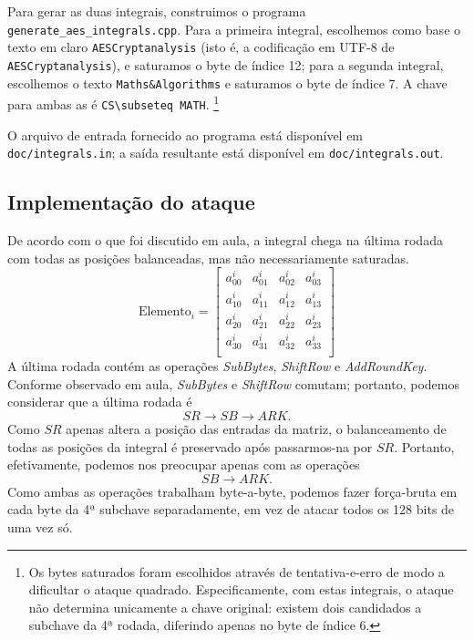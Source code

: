 \documentclass{article}
\begin{document}
Para gerar as duas integrais, construimos o programa \verb"generate_aes_integrals.cpp".
Para a primeira integral, escolhemos como base o texto em claro
\verb"AESCryptanalysis"
(isto é, a codificação em UTF-8 de \verb"AESCryptanalysis"),
e saturamos o byte de índice 12;
para a segunda integral, escolhemos o texto \verb"Maths&Algorithms"
e saturamos o byte de índice 7.
A chave para ambas as é \verb"CS\subseteq MATH".
\footnote{
    Os bytes saturados foram escolhidos através de tentativa-e-erro
    de modo a dificultar o ataque quadrado.
    Especificamente,
    com estas integrais,
    o ataque não determina unicamente a chave original:
    existem dois candidados a subchave da 4ª rodada,
    diferindo apenas no byte de índice 6.
}

O arquivo de entrada fornecido ao programa está disponível em
\verb"doc/integrals.in";
a saída resultante está disponível em \verb"doc/integrals.out".

\subsection{Implementação do ataque}

De acordo com o que foi discutido em aula,
a integral chega na última rodada com todas as posições balanceadas,
mas não necessariamente saturadas.
\begin{equation*}
    \text{Elemento}_i =
    \begin{bmatrix}
        a^i_{00} & a^i_{01} & a^i_{02} & a^i_{03} \\
        a^i_{10} & a^i_{11} & a^i_{12} & a^i_{13} \\
        a^i_{20} & a^i_{21} & a^i_{22} & a^i_{23} \\
        a^i_{30} & a^i_{31} & a^i_{32} & a^i_{33} \\
    \end{bmatrix}
\end{equation*}
A última rodada contém as operações \emph{SubBytes},
\emph{ShiftRow} e \emph{AddRoundKey}.
Conforme observado em aula, \emph{SubBytes} e \emph{ShiftRow} comutam;
portanto, podemos considerar que a última rodada é
\begin{equation*}
    SR \to SB \to ARK.
\end{equation*}
Como $SR$ apenas altera a posição das entradas da matriz,
o balanceamento de todas as posições da integral é preservado
após passarmos-na por $SR$.
Portanto, efetivamente,
podemos nos preocupar apenas com as operações
\begin{equation*}
    SB \to ARK.
\end{equation*}
Como ambas as operações trabalham byte-a-byte,
podemos fazer força-bruta em cada byte da 4ª subchave separadamente,
em vez de atacar todos os 128 bits de uma vez só.
\end{document}
